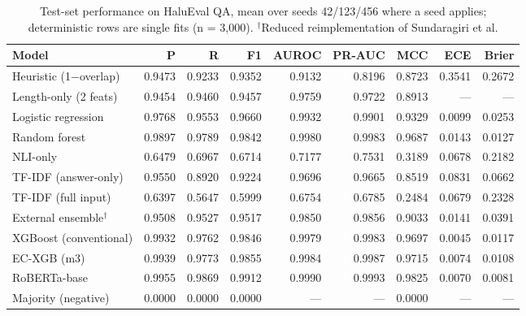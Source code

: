 \documentclass[a4paper,fleqn]{cas-sc}
\begin{document}
\begin{table}[pos=htbp]
  \centering
  \caption{Test-set performance on HaluEval QA, mean over seeds 42/123/456 where a seed applies; deterministic rows are single fits (n = 3{,}000). $^{\dagger}$Reduced reimplementation of Sundaragiri et al.}
  \label{tab:models}
  \begin{tabular}{lrrrrrrrr}
    \toprule
    \textbf{Model}              & \textbf{P} & \textbf{R} & \textbf{F1} & \textbf{AUROC} & \textbf{PR-AUC} & \textbf{MCC} & \textbf{ECE} & \textbf{Brier} \\
    \midrule
    Heuristic (1$-$overlap)     & 0.9473     & 0.9233     & 0.9352      & 0.9132         & 0.8196          & 0.8723       & 0.3541       & 0.2672         \\
    Length-only (2 feats)       & 0.9454     & 0.9460     & 0.9457      & 0.9759         & 0.9722          & 0.8913       & ---          & ---            \\
    Logistic regression         & 0.9768     & 0.9553     & 0.9660      & 0.9932         & 0.9901          & 0.9329       & 0.0099       & 0.0253         \\
    Random forest               & 0.9897     & 0.9789     & 0.9842      & 0.9980         & 0.9983          & 0.9687       & 0.0143       & 0.0127         \\
    NLI-only                    & 0.6479     & 0.6967     & 0.6714      & 0.7177         & 0.7531          & 0.3189       & 0.0678       & 0.2182         \\
    TF-IDF (answer-only)        & 0.9550     & 0.8920     & 0.9224      & 0.9696         & 0.9665          & 0.8519       & 0.0831       & 0.0662         \\
    TF-IDF (full input)         & 0.6397     & 0.5647     & 0.5999      & 0.6754         & 0.6785          & 0.2484       & 0.0679       & 0.2328         \\
    External ensemble$^\dagger$ & 0.9508     & 0.9527     & 0.9517      & 0.9850         & 0.9856          & 0.9033       & 0.0141       & 0.0391         \\
    XGBoost (conventional)      & 0.9932     & 0.9762     & 0.9846      & 0.9979         & 0.9983          & 0.9697       & 0.0045       & 0.0117         \\
    EC-XGB (m3)                 & 0.9939     & 0.9773     & 0.9855      & 0.9984         & 0.9987          & 0.9715       & 0.0074       & 0.0108         \\
    RoBERTa-base                & 0.9955     & 0.9869     & 0.9912      & 0.9990         & 0.9993          & 0.9825       & 0.0070       & 0.0081         \\
    Majority (negative)         & 0.0000     & 0.0000     & 0.0000      & ---            & ---             & 0.0000       & ---          & ---            \\
    \bottomrule
  \end{tabular}
\end{table}
\end{document}
